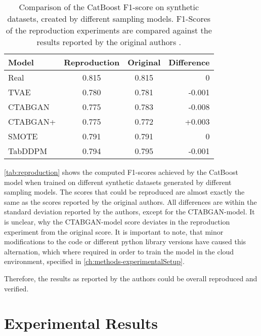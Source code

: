 \begin{table}[h]
	\centering
	\begin{tabular}{l|c|c|r}
		\hline
		\textbf{Model} & \textbf{Reproduction} & \textbf{Original} & \textbf{Difference} \\ \hline
		Real           & 0.815                 & 0.815             & 0                   \\ \hline
		TVAE           & 0.780                 & 0.781             & -0.001              \\ \hline
		CTABGAN        & 0.775                 & 0.783             & -0.008              \\ \hline
		CTABGAN+       & 0.775                 & 0.772             & +0.003              \\ \hline
		SMOTE          & 0.791                 & 0.791             & 0                   \\ \hline
		TabDDPM        & 0.794                 & 0.795             & -0.001              \\ \hline
	\end{tabular}
	\caption[Reproduction of original Results]{Comparison of the CatBoost F1-score on synthetic datasets, created by different sampling models.
		F1-Scores of the reproduction experiments are compared against the results reported by the original authors \cite[Table 4, p. 8]{kotelnikov2022TabDDPMModellingTabular}.
	}
	\label{tab:reproduction}
\end{table}

\autoref{tab:reproduction} shows the computed F1-scores achieved by the CatBoost model when trained on different synthetic datasets generated by different sampling models.
The scores that could be reproduced are almost exactly the same as the scores reported by the original authors.
All differences are within the standard deviation reported by the authors, except for the CTABGAN-model.
It is unclear, why the CTABGAN-model score deviates in the reproduction experiment from the original score.
It is important to note, that minor modifications to the code or different python library versions have caused this alternation, which where required in order to train the model in the cloud environment, specified in \autoref{ch:methods-experimentalSetup}.

Therefore, the results as reported by the authors could be overall reproduced and verified.

\section{Experimental Results}
\label{ch:results-experimentalResults}

